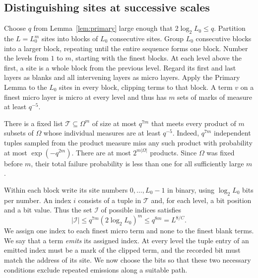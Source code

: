 \subsection{Distinguishing sites at successive scales}

Choose \(q\) from Lemma~\ref{lem:primary} large enough that
\(2\log_2 L_0\le q\). Partition the \(L=L_0^m\) sites into blocks
of \(L_0\) consecutive sites. Group \(L_0\) consecutive blocks into
a larger block, repeating until the entire sequence forms one block.
Number the levels from \(1\) to \(m\), starting with the finest blocks.
At each level above the first, a site is a whole block from the previous
level. Regard its first and last layers as blanks and all intervening
layers as micro layers. Apply the Primary Lemma to the \(L_0\) sites
in every block, clipping terms to that block. A term \(v\) on a finest
micro layer is micro at every level and thus has \(m\) sets of marks of
measure at least \(q^{-5}\).

There is a fixed list \(\mathcal T\subseteq\Omega^m\) of size at most
\(q^{7m}\) that meets every product of \(m\) subsets of \(\Omega\)
whose individual measures are at least \(q^{-5}\). Indeed, \(q^{7m}\)
independent tuples sampled from the product measure miss any such
product with probability at most \(\exp(-q^{2m})\). There are at most
\(2^{m|\Omega|}\) products. Since \(\Omega\) was fixed before \(m\),
their total failure probability is less than one for all sufficiently
large \(m\).

Within each block write its site numbers \(0,\ldots,L_0-1\) in binary,
using \(\log_2 L_0\) bits per number. An index \(i\) consists of a
tuple in \(\mathcal T\) and, for each level, a bit position and a bit
value. Thus the set \(\mathcal I\) of possible indices satisfies
\begin{equation}\label{eq:tensor-index-size}
        |\mathcal I|\le q^{7m}(2\log_2 L_0)^m
        \le q^{8m}=L^{8/C}.
\end{equation}
We assign one index to each finest micro term and none to the finest
blank terms. We say that a term \emph{emits} its assigned index.
At every level the tuple entry of an emitted index must be a mark of
the clipped term, and the recorded bit must match the address of its
site. We now choose the bits so that these two necessary conditions
exclude repeated emissions along a suitable path.

